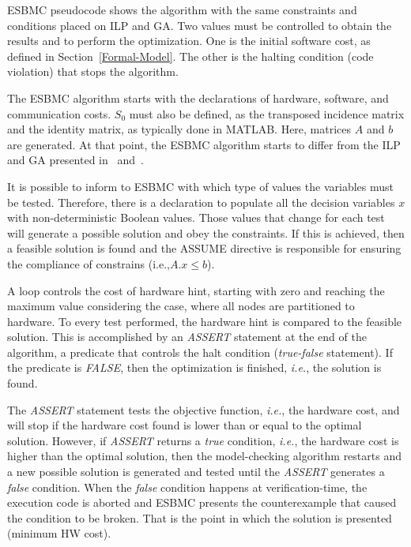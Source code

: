 ESBMC pseudocode shows the algorithm with the same constraints and conditions placed on ILP and GA. Two values must be controlled to obtain the results and to perform the optimization. One is the initial software cost, as defined in Section~\ref{Formal-Model}. The other is the halting condition (code violation) that stops the algorithm.

The ESBMC algorithm starts with the declarations of hardware, software, and communication costs. $S_0$ must also be defined, as the transposed incidence matrix and the identity matrix, as typically done in MATLAB. Here, matrices $A$ and $b$ are generated. At that point, the ESBMC algorithm starts to differ from the ILP and GA presented in~\cite{Trindade2015} and~\cite{Trindade2014}.

It is possible to inform to ESBMC with which type of values the variables must be tested. Therefore, there is a declaration to populate all the decision variables $x$ with non-deterministic Boolean values. Those values that change for each test will generate a possible solution and obey the constraints. If this is achieved, then a feasible solution is found and the ASSUME directive is responsible for ensuring the compliance of constrains (i.e.,$A.x \leq b$).

A loop controls the cost of hardware hint, starting with zero and reaching the maximum value considering the case, where all nodes are partitioned to hardware. To every test performed, the hardware hint is compared to the feasible solution. This is accomplished by an \textit{ASSERT} statement at the end of the algorithm, a predicate that controls the halt condition (\textit{true-false} statement). If the predicate is \textit{FALSE}, then the optimization is finished, {\it i.e.}, the solution is found. 

The \textit{ASSERT} statement tests the objective function, {\it i.e.}, the hardware cost, and will stop if the hardware cost found is lower than or equal to the optimal solution. However, if \textit{ASSERT} returns a \textit{true} condition, {\it i.e.}, the hardware cost is higher than the optimal solution, then the model-checking algorithm restarts and a new possible solution is generated and tested until the \textit{ASSERT} generates a \textit{false} condition. When the \textit{false} condition happens at verification-time, the execution code is aborted and ESBMC presents the counterexample that caused the condition to be broken. That is the point in which the solution is presented (minimum HW cost).

